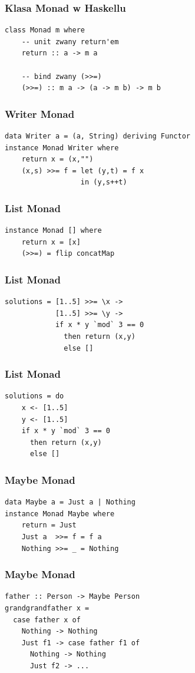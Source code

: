 \documentclass[14pt]{beamer}
\begin{document}
\begin{frame}[fragile]
\frametitle{Klasa Monad w Haskellu}
\begin{verbatim}
class Monad m where
    -- unit zwany return'em
    return :: a -> m a

    -- bind zwany (>>=)
    (>>=) :: m a -> (a -> m b) -> m b
\end{verbatim}
\end{frame}

\begin{frame}[fragile]
\frametitle{Writer Monad}
\begin{verbatim}
data Writer a = (a, String) deriving Functor
instance Monad Writer where
    return x = (x,"")
    (x,s) >>= f = let (y,t) = f x
                  in (y,s++t)
\end{verbatim}
\end{frame}

\begin{frame}[fragile]
\frametitle{List Monad}
\begin{verbatim}
instance Monad [] where
    return x = [x]
    (>>=) = flip concatMap
\end{verbatim}
\end{frame}

\begin{frame}[fragile]
\frametitle{List Monad}
\begin{verbatim}
solutions = [1..5] >>= \x ->
            [1..5] >>= \y ->
            if x * y `mod` 3 == 0
              then return (x,y)
              else []
\end{verbatim}
\end{frame}

\begin{frame}[fragile]
\frametitle{List Monad}
\begin{verbatim}
solutions = do
    x <- [1..5]
    y <- [1..5]
    if x * y `mod` 3 == 0
      then return (x,y)
      else []
\end{verbatim}
\end{frame}

\begin{frame}[fragile]
\frametitle{Maybe Monad}
\begin{verbatim}
data Maybe a = Just a | Nothing
instance Monad Maybe where
    return = Just
    Just a  >>= f = f a
    Nothing >>= _ = Nothing
\end{verbatim}
\end{frame}

\begin{frame}[fragile]
\frametitle{Maybe Monad}
\begin{verbatim}
father :: Person -> Maybe Person
grandgrandfather x =
  case father x of
    Nothing -> Nothing
    Just f1 -> case father f1 of
      Nothing -> Nothing
      Just f2 -> ...
\end{verbatim}
\end{frame}
\end{document}
